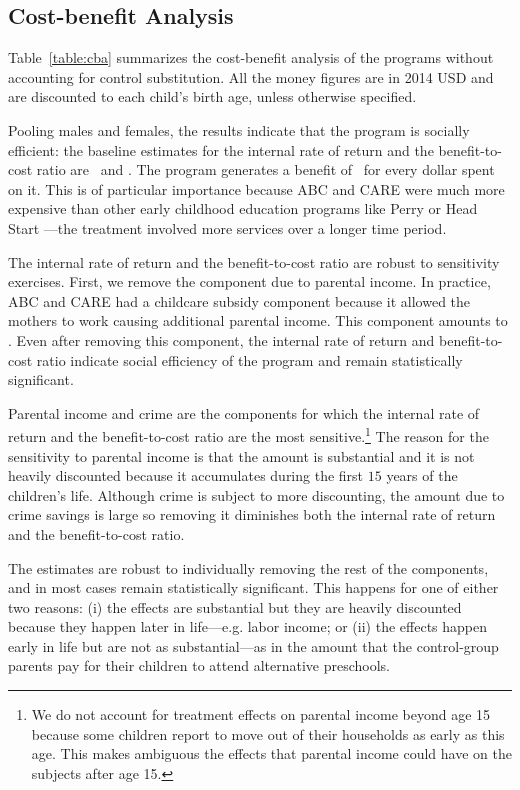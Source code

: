 \subsection{Cost-benefit Analysis} \label{section:cbaresults}

Table~\ref{table:cba} summarizes the cost-benefit analysis of the programs without accounting for control substitution. All the money figures are in 2014 USD and are discounted to each child's birth age, unless otherwise specified.

Pooling males and females, the results indicate that the program is socially efficient: the baseline estimates for the internal rate of return and the benefit-to-cost ratio are \irrp\ and \bcp. The program generates a benefit of \bcp\ for every dollar spent on it. This is of particular importance because ABC and CARE were much more expensive than other early childhood education programs like Perry or Head Start \citep{Elango_Hojman_etal_2016_Early-Edu}---the treatment involved more services over a longer time period.

The internal rate of return and the benefit-to-cost ratio are robust to sensitivity exercises. First, we remove the component due to parental income. In practice, ABC and CARE had a childcare subsidy component because it allowed the mothers to work causing additional parental income. This component amounts to \parincomenpvp. Even after removing this component, the internal rate of return and benefit-to-cost ratio indicate social efficiency of the program and remain statistically significant.

Parental income and crime are the components for which the internal rate of return and the benefit-to-cost ratio are the most sensitive.\footnote{We do not account for treatment effects on parental income beyond age 15 because some children report to move out of their households as early as this age. This makes ambiguous the effects that parental income could have on the subjects after age 15.} The reason for the sensitivity to parental income is that the amount is substantial and it is not heavily discounted because it accumulates during the first $15$ years of the children's life. Although crime is subject to more discounting, the amount due to crime savings is large so removing it diminishes both the internal rate of return and the benefit-to-cost ratio.

The estimates are robust to individually removing the rest of the components, and in most cases remain statistically significant. This happens for one of either two reasons: (i) the effects are substantial but they are heavily discounted because they happen later in life---e.g. labor income; or (ii) the effects happen early in life but are not as substantial---as in the amount that the control-group parents pay for their children to attend alternative preschools.

